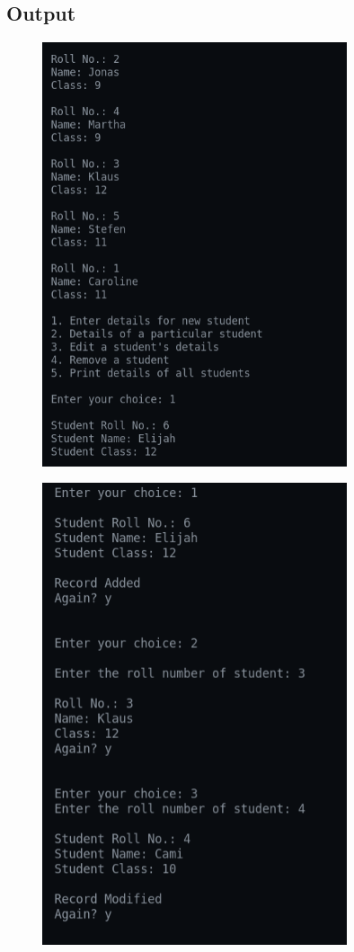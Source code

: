 \documentclass[12pt]{article}
\begin{document}
\subsection{Output}
\begin{figure}[h]
    \centering
    \includegraphics[width=0.8\textwidth]{13a.png}
\end{figure}
\newpage
\begin{figure}[h]
    \centering
    \includegraphics[width=0.8\textwidth]{13b.png}
\end{figure}
\end{document}
